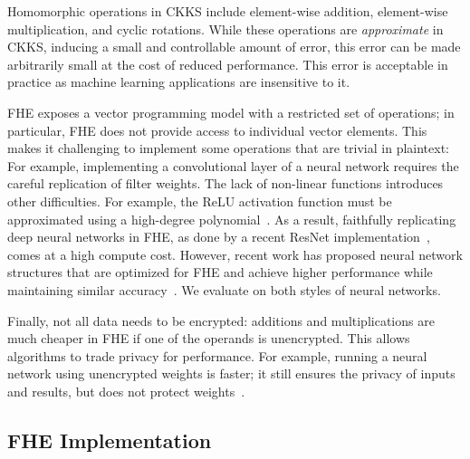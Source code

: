 Homomorphic operations in CKKS include element-wise addition, element-wise multiplication,
and cyclic rotations.
While these operations are \emph{approximate} in CKKS, inducing a small and
controllable amount of error, this error can be made arbitrarily small at the
cost of reduced performance. %
This error is acceptable in practice as machine learning applications
are insensitive to it.

FHE exposes a vector programming model with a restricted set of operations; in particular,
FHE does not provide access to individual vector elements.
This makes it challenging to implement some operations
that are trivial in plaintext:
For example,
implementing a convolutional layer of a neural network requires the careful
replication of filter weights.
The lack of non-linear functions introduces other difficulties.
For example, the ReLU activation function must be approximated
using a high-degree polynomial~\cite{lee:2021:precise}.
%
As a result, faithfully replicating deep neural networks in FHE,
as done by a recent ResNet implementation~\cite{lee:2021:privacy}, comes at a high compute cost.
However, recent work has proposed neural network structures that are optimized
for FHE and achieve higher performance while maintaining similar accuracy~\cite{brutzkus:icml19:low}.
We evaluate \name on both styles of neural networks.

Finally, not all data needs to be encrypted:
additions and multiplications are much cheaper in FHE if one of the operands is unencrypted.
This allows algorithms to trade privacy for performance.
For example, running a neural network using unencrypted weights is faster; it
still ensures the privacy of inputs and results, but does not
protect weights~\cite{brutzkus:icml19:low}.

\subsection{FHE Implementation}
\label{sec:fhe_operation}

